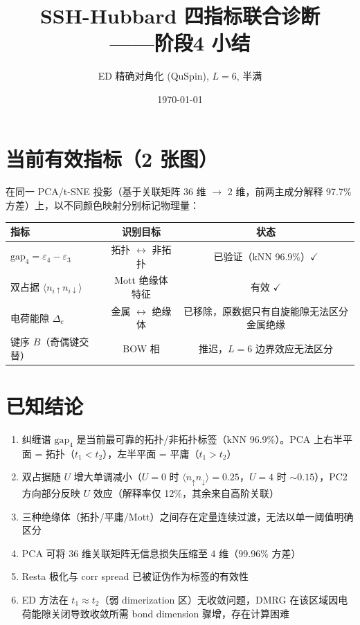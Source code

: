 \documentclass[11pt,a4paper]{article}
\title{SSH-Hubbard 四指标联合诊断\\——阶段4 小结}
\author{ED 精确对角化 (QuSpin), $L=6$, 半满}
\date{\today}
\begin{document}
\maketitle

\section{当前有效指标（2 张图）}

在同一 PCA/t-SNE 投影（基于关联矩阵 36 维 $\to$ 2 维，前两主成分解释 97.7\% 方差）上，以不同颜色映射分别标记物理量：

\begin{table}[ht]
\centering
\begin{tabular}{lcc}
\toprule
指标 & 识别目标 & 状态 \\
\midrule
$\mathrm{gap}_4 = \varepsilon_4 - \varepsilon_3$ & 拓扑 $\leftrightarrow$ 非拓扑 & 已验证（kNN 96.9\%）$\checkmark$ \\
双占据 $\langle n_{i\uparrow} n_{i\downarrow} \rangle$ & Mott 绝缘体特征 & 有效 $\checkmark$ \\
电荷能隙 $\Delta_c$ & 金属 $\leftrightarrow$ 绝缘体 & 已移除，原数据只有自旋能隙无法区分金属绝缘 \\
键序 $B$（奇偶键交替） & BOW 相 & 推迟，$L=6$ 边界效应无法区分 \\
\bottomrule
\end{tabular}
\end{table}

\section{已知结论}

\begin{enumerate}
  \item 纠缠谱 $\mathrm{gap}_4$ 是当前最可靠的拓扑/非拓扑标签（kNN 96.9\%）。PCA 上右半平面 = 拓扑（$t_1<t_2$），左半平面 = 平庸（$t_1>t_2$）
  \item 双占据随 $U$ 增大单调减小（$U=0$ 时 $\langle n_\uparrow n_\downarrow \rangle=0.25$，$U=4$ 时 $\sim 0.15$），PC2 方向部分反映 $U$ 效应（解释率仅 12\%，其余来自高阶关联）
  \item 三种绝缘体（拓扑/平庸/Mott）之间存在定量连续过渡，无法以单一阈值明确区分
  \item PCA 可将 36 维关联矩阵无信息损失压缩至 4 维（99.96\% 方差）
  \item Resta 极化与 corr spread 已被证伪作为标签的有效性
  \item ED 方法在 $t_1\approx t_2$（弱 dimerization 区）无收敛问题，DMRG 在该区域因电荷能隙关闭导致收敛所需 bond dimension 骤增，存在计算困难
\end{enumerate}
\end{document}
